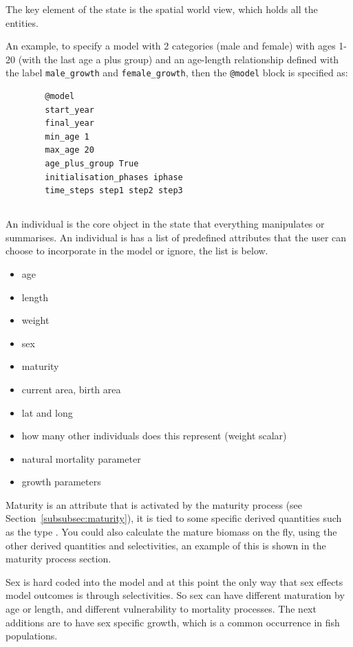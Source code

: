The key element of the state is the spatial world view, which holds all the entities.

An example, to specify a model with 2 categories (male and female) with ages 1-20 (with the last age a plus group) and an age-length relationship defined with the label \texttt{male\_growth} and \texttt{female\_growth}, then the \texttt{@model} block is specified as:
{\small{\begin{verbatim}
		@model
		start_year
		final_year
		min_age 1
		max_age 20
		age_plus_group True
		initialisation_phases iphase
		time_steps step1 step2 step3
\end{verbatim}}}


\subsection{\label{sec:individuals}}
An individual is the core object in the state that everything manipulates or summarises. An individual is has a list of predefined attributes that the user can choose to incorporate in the model or ignore, the list is below.

\begin{itemize}
	\item age
	\item length
	\item weight
	\item sex
	\item maturity
	\item current area, birth area
	\item lat and long
	\item {} how many other individuals does this represent (weight scalar)
	\item natural mortality parameter
	\item growth parameters
\end{itemize}

Maturity is an attribute that is activated by the maturity process (see Section~\ref{subsubsec:maturity}), it is tied to some specific derived quantities such as the type . You could also calculate the mature biomass on the fly, using the other derived quantities and selectivities, an example of this is shown in the maturity process section.

Sex is hard coded into the model and at this point the only way that sex effects model outcomes is through selectivities. So sex can have different maturation by age or length, and different vulnerability to mortality processes. The next additions are to have sex specific growth, which is a common occurrence in fish populations.

